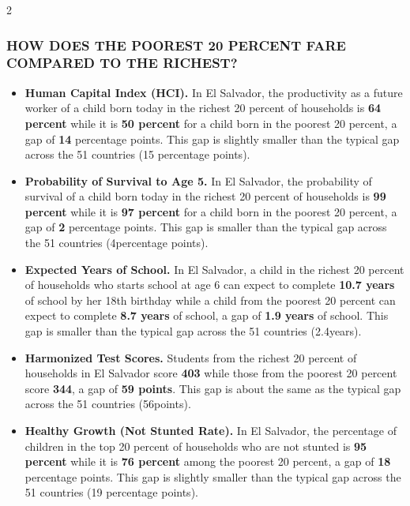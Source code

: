 \documentclass[8pt,]{article}
\begin{document}
\begin {multicols}{2}

\hypertarget{section}{%
\subsubsection{\texorpdfstring{\textcolor{bondiblue}{\textbf{H\small{OW DOES THE POOREST 20 PERCENT FARE COMPARED TO THE RICHEST?}}}}{}}\label{section}}

\begin{itemize}
\item
  \textbf{Human Capital Index (HCI).} In El Salvador, the productivity
  as a future worker of a child born today in the richest 20 percent of
  households is \textbf{64 percent} while it is \textbf{50 percent} for
  a child born in the poorest 20 percent, a gap of \textbf{14}
  percentage points. This gap is slightly smaller than the typical gap
  across the 51 countries (15 percentage points).
\item
  \textbf{Probability of Survival to Age 5.} In El Salvador, the
  probability of survival of a child born today in the richest 20
  percent of households is \textbf{99 percent} while it is \textbf{97
  percent} for a child born in the poorest 20 percent, a gap of
  \textbf{2} percentage points. This gap is smaller than the typical gap
  across the 51 countries (4percentage points).
\item
  \textbf{Expected Years of School.} In El Salvador, a child in the
  richest 20 percent of households who starts school at age 6 can expect
  to complete \textbf{10.7 years} of school by her 18th birthday while a
  child from the poorest 20 percent can expect to complete \textbf{8.7
  years} of school, a gap of \textbf{1.9 years} of school. This gap is
  smaller than the typical gap across the 51 countries (2.4years).
\item
  \textbf{Harmonized Test Scores.} Students from the richest 20 percent
  of households in El Salvador score \textbf{403} while those from the
  poorest 20 percent score \textbf{344}, a gap of \textbf{59 points}.
  This gap is about the same as the typical gap across the 51 countries
  (56points).
\item
  \textbf{Healthy Growth (Not Stunted Rate).} In El Salvador, the
  percentage of children in the top 20 percent of households who are not
  stunted is \textbf{95 percent} while it is \textbf{76 percent} among
  the poorest 20 percent, a gap of \textbf{18} percentage points. This
  gap is slightly smaller than the typical gap across the 51 countries
  (19 percentage points).
\end{itemize}


\end{multicols}
\end{document}
